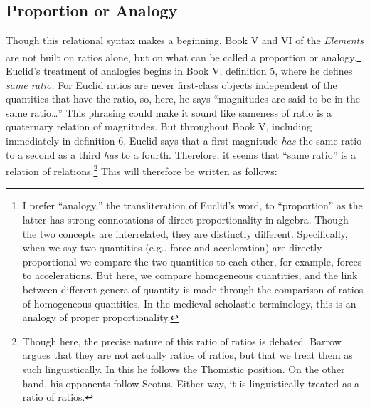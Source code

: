 \documentclass[11pt]{article}
\newcommand{\flushleftright}{\noindent\justifying}
\begin{document}
\flushleftright%
\subsection{Proportion or Analogy}
Though this relational syntax makes a beginning, Book V and VI of the \textit{Elements} are not built on ratios alone, but on what can be called a proportion or analogy.\footnote{I prefer ``analogy,'' the transliteration of Euclid's word, to ``proportion'' as the latter has strong connotations of direct proportionality in algebra. Though the two concepts are interrelated, they are distinctly different. Specifically, when we say two quantities (e.g., force and acceleration) are directly proportional we compare the two quantities to each other, for example, forces to accelerations. But here, we compare homogeneous quantities, and the link between different genera of quantity is made through the comparison of ratios of homogeneous quantities. In the medieval scholastic terminology, this is an analogy of proper proportionality.} Euclid's treatment of analogies begins in Book V, definition 5, where he defines \textit{same ratio.} For Euclid ratios are never first-class objects independent of the quantities that have the ratio, so, here, he says ``magnitudes are said to be in the same ratio\ldots'' This phrasing could make it sound like sameness of ratio is a quaternary relation of magnitudes. But throughout Book V, including immediately in definition 6, Euclid says that a first magnitude \textit{has} the same ratio to a second as a third \textit{has} to a fourth. Therefore, it seems that ``same ratio'' is a relation of relations.\footnote{Though here, the precise nature of this ratio of ratios is debated. Barrow argues that they are not actually ratios of ratios, but that we treat them as such linguistically. In this he follows the Thomistic position. On the other hand, his opponents follow Scotus. Either way, it is linguistically treated as a ratio of ratios.} This will therefore be written as follows:

\centering
{}
\end{document}
